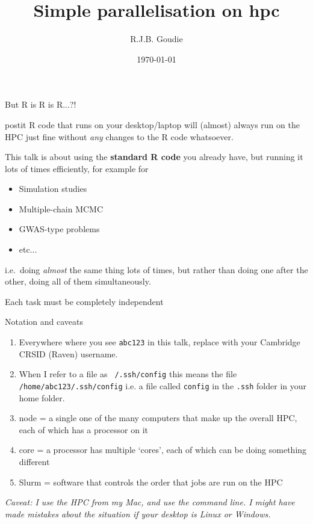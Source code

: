\documentclass[t,10pt]{beamer}
\newenvironment{highlightblock}[0]%
  {\begin{beamercolorbox}[sep=1em]{postit}}%
  {\end{beamercolorbox}}
\begin{document}
\title{Simple parallelisation on hpc}
\author{R.J.B. Goudie}
\date{\today}
\maketitle

\begin{frame}{But R is R is R...?!}

\begin{highlightblock}
R code that runs on your desktop/laptop will (almost) always run on the HPC just fine without \textit{any} changes to the R code whatsoever.
\end{highlightblock}

\bigskip
This talk is about using the \textbf{standard R code} you already have, but running it lots of times efficiently, for example for

\begin{itemize}
\item Simulation studies
\item Multiple-chain MCMC
\item GWAS-type problems
\item etc...
\end{itemize}

i.e.\ doing \textit{almost} the same thing lots of times, but rather than doing one after the other, doing all of them simultaneously.

\bigskip
\alert{Each task must be completely independent}
\end{frame}

\begin{frame}[fragile]{Notation and caveats}

\begin{enumerate}
\item Everywhere where you see \texttt{abc123} in this talk, replace
with your Cambridge CRSID (Raven) username.

\item When I refer to a file as \texttt{~/.ssh/config} this means the file \texttt{/home/abc123/.ssh/config} i.e. a file called \texttt{config} in the \texttt{.ssh} folder in your home folder.


\item node = a single one of the many computers that make up the overall HPC, each of which has a processor on it
\item core = a processor has multiple `cores', each of which can be doing something different
\item Slurm = software that controls the order that jobs are run on the HPC
\end{enumerate}

\bigskip
\textit{Caveat: I use the HPC from my Mac, and use the command line. I might have made mistakes about the situation if your desktop is Linux or Windows.}

\end{frame}
\end{document}
